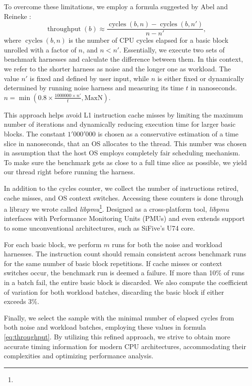 To overcome these limitations, we employ a formula suggested by Abel and Reineke \cite{abelUiCAAccurateThroughput2022}:
\begin{equation}
\operatorname{throughput}(b) \approx \frac{\operatorname{cycles}(b, n) - \operatorname{cycles}(b, n')}{n - n'},
  \label{eq:throughput}
\end{equation}
where $\operatorname{cycles}(b, n)$ is the number of CPU cycles elapsed for a basic block unrolled with a factor of $n$,
and $n < n'$. Essentially, we execute two sets of benchmark harnesses and calculate the difference between
them. In this context, we refer to the shorter harness as noise and the longer one as workload. The value $n'$
is fixed and defined by user input, while $n$ is either fixed or dynamically determined by running noise
harness and measuring its time $t$ in nanoseconds. $n = \operatorname{min}(0.8 \times \frac{1000000 \times n'}{t}, \mathrm{MaxN})$.

This approach helps avoid L1 instruction cache misses by limiting the maximum number of iterations and 
dynamically reducing execution time for larger basic blocks. The constant $1'000'000$ is chosen as a 
conservative estimation of a time slice in nanoseconds, that an OS allocates to the thread. This number 
was chosen in assumption that the host OS employs completely fair scheduling mechanism. To make sure the 
benchmark gets as close to a full time slice as possible, we yield our thread right before running the 
harness.

In addition to the cycles counter, we collect the number of instructions retired, cache misses, and OS 
context switches. Accessing these counters is done through a library we wrote called 
\textit{libpmu}\footnote{}. 
Designed as a cross-platform tool, \textit{libpmu} interfaces with Performance Monitoring Units (PMUs) 
and even extends support to some unconventional architectures, such as SiFive's U74 core.

For each basic block, we perform $m$ runs for both the noise and workload harnesses. The instruction 
count should remain consistent across benchmark runs for the same number of basic block repetitions. 
If cache misses or context switches occur, the benchmark run is deemed a failure. If more than 10\% of 
runs in a batch fail, the entire basic block is discarded. We also compute the coefficient of variation 
for both workload batches, discarding the basic block if either exceeds 3\%.

Finally, we select the sample with the minimal number of elapsed cycles from both noise and workload 
batches, employing these values in formula \ref{eq:throughput}. By utilizing this refined approach, 
we strive to obtain more accurate timing information for modern CPU architectures, accommodating their 
complexities and optimizing performance analysis.


